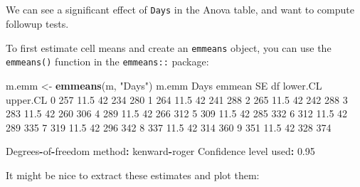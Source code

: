 \documentclass[]{article}
\newenvironment{Shaded}{\begin{snugshade}}{\end{snugshade}}
\newcommand{\DataTypeTok}[1]{\textcolor[rgb]{0.13,0.29,0.53}{#1}}
\newcommand{\DecValTok}[1]{\textcolor[rgb]{0.00,0.00,0.81}{#1}}
\newcommand{\FloatTok}[1]{\textcolor[rgb]{0.00,0.00,0.81}{#1}}
\newcommand{\KeywordTok}[1]{\textcolor[rgb]{0.13,0.29,0.53}{\textbf{#1}}}
\newcommand{\NormalTok}[1]{#1}
\newcommand{\OperatorTok}[1]{\textcolor[rgb]{0.81,0.36,0.00}{\textbf{#1}}}
\newcommand{\StringTok}[1]{\textcolor[rgb]{0.31,0.60,0.02}{#1}}
\let\oldsubparagraph\subparagraph
\renewcommand{\subparagraph}[1]{\oldsubparagraph{#1}\mbox{}}
\begin{document}
\hypertarget{section-14}{%
\subparagraph{}\label{section-14}}

We can see a significant effect of \texttt{Days} in the Anova table, and want to
compute followup tests.

To first estimate cell means and create an \texttt{emmeans} object, you can use the
\texttt{emmeans()} function in the \texttt{emmeans::} package:

\begin{Shaded}
\begin{Highlighting}[]
\NormalTok{m.emm <-}\StringTok{ }\KeywordTok{emmeans}\NormalTok{(m, }\StringTok{"Days"}\NormalTok{)}
\NormalTok{m.emm}
\NormalTok{ Days emmean   SE df lower.CL upper.CL}
    \DecValTok{0}    \DecValTok{257} \FloatTok{11.5} \DecValTok{42}      \DecValTok{234}      \DecValTok{280}
    \DecValTok{1}    \DecValTok{264} \FloatTok{11.5} \DecValTok{42}      \DecValTok{241}      \DecValTok{288}
    \DecValTok{2}    \DecValTok{265} \FloatTok{11.5} \DecValTok{42}      \DecValTok{242}      \DecValTok{288}
    \DecValTok{3}    \DecValTok{283} \FloatTok{11.5} \DecValTok{42}      \DecValTok{260}      \DecValTok{306}
    \DecValTok{4}    \DecValTok{289} \FloatTok{11.5} \DecValTok{42}      \DecValTok{266}      \DecValTok{312}
    \DecValTok{5}    \DecValTok{309} \FloatTok{11.5} \DecValTok{42}      \DecValTok{285}      \DecValTok{332}
    \DecValTok{6}    \DecValTok{312} \FloatTok{11.5} \DecValTok{42}      \DecValTok{289}      \DecValTok{335}
    \DecValTok{7}    \DecValTok{319} \FloatTok{11.5} \DecValTok{42}      \DecValTok{296}      \DecValTok{342}
    \DecValTok{8}    \DecValTok{337} \FloatTok{11.5} \DecValTok{42}      \DecValTok{314}      \DecValTok{360}
    \DecValTok{9}    \DecValTok{351} \FloatTok{11.5} \DecValTok{42}      \DecValTok{328}      \DecValTok{374}

\NormalTok{Degrees}\OperatorTok{-}\NormalTok{of}\OperatorTok{-}\NormalTok{freedom method}\OperatorTok{:}\StringTok{ }\NormalTok{kenward}\OperatorTok{-}\NormalTok{roger }
\NormalTok{Confidence level used}\OperatorTok{:}\StringTok{ }\FloatTok{0.95} 
\end{Highlighting}
\end{Shaded}

It might be nice to extract these estimates and plot them:

\begin{Shaded}
\end{Shaded}
\end{document}
